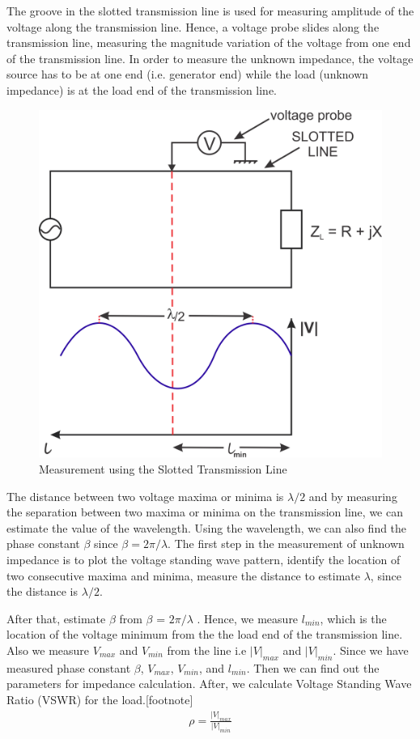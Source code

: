 The groove in the slotted transmission line is used for measuring amplitude of the voltage along the transmission line. Hence, a voltage probe slides along the transmission line, measuring the magnitude variation of the voltage from one end of the transmission line. In order to measure the unknown impedance, the voltage source has to be at one end (i.e. generator end) while the load (unknown impedance) is at the load end of the transmission line.
\begin{figure}[h]
\centering
\includegraphics[width=1\linewidth]{./graphics/group10diagram1}
\caption{Measurement using the Slotted Transmission Line}
\end{figure}

The distance between two voltage maxima or minima is $\lambda/2$ and by measuring the separation between two maxima or minima on the transmission line, we can estimate the value of the wavelength. Using the wavelength, we can also find the phase constant $\beta$ since $\beta = 2\pi/\lambda$. The first step in the measurement of unknown impedance is to plot the voltage standing wave pattern, identify the location of two consecutive maxima and minima, measure the distance to estimate $\lambda$, since the distance is $\lambda/2$.\newline 

After that, estimate $\beta$ from $\beta$ = $2\pi/\lambda$ . Hence, we measure $l_{min}$, which is the location of the voltage minimum from the the load end of the transmission line. Also we measure $V_{max}$ and $V_{min}$ from the line i.e $|V|_{max}$ and $|V|_{min}$. Since we have measured phase constant $\beta$, $V_{max}$, $V_{min}$, and $l_{min}$. Then we can find out the parameters for impedance calculation. After, we calculate Voltage Standing Wave Ratio (VSWR) for the load.[footnote]
\begin{align}
\rho = \frac{|V|_{max}}{|V|_{min}}
\end{align}

